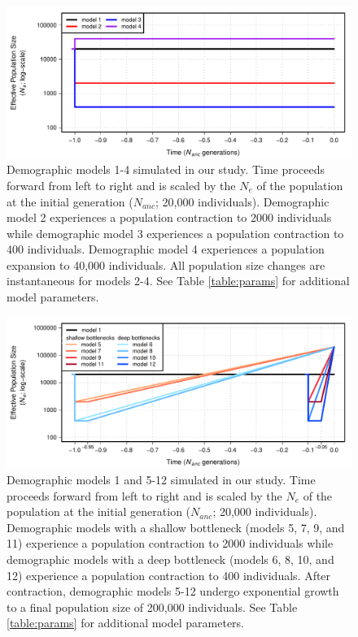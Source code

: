 \documentclass[9pt,twocolumn,twoside]{rilabRxiv}
\begin{document}
\begin{figure}[h!]
\includegraphics[width=0.8\linewidth]{figures/FigS1.pdf}
\caption{Demographic models 1-4 simulated in our study.
Time proceeds forward from left to right and is scaled by the $N_e$ of the population at the initial generation ($N_{anc}$; 20,000 individuals).
Demographic model 2 experiences a population contraction to 2000 individuals while demographic model 3 experiences a population contraction to 400 individuals.
Demographic model 4 experiences a population expansion to 40,000 individuals.
All population size changes are instantaneous for models 2-4.
See Table \ref{table:params} for additional model parameters.}
\label{fig:models1}
\end{figure}
\pagebreak

\begin{figure}[t]
\includegraphics[width=0.8\linewidth]{figures/FigS2.pdf}
\caption{Demographic models 1 and 5-12 simulated in our study.
Time proceeds forward from left to right and is scaled by the $N_e$ of the population at the initial generation ($N_{anc}$; 20,000 individuals).
Demographic models with a shallow bottleneck (models 5, 7, 9, and 11) experience a population contraction to 2000 individuals while demographic models with a deep bottleneck (models 6, 8, 10, and 12) experience a population contraction to 400 individuals.
After contraction, demographic models 5-12 undergo exponential growth to a final population size of 200,000 individuals.
See Table \ref{table:params} for additional model parameters.}
\label{fig:models2}
\end{figure}
\pagebreak
\end{document}
